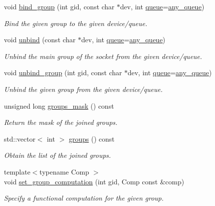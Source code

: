 \begin{DoxyCompactItemize}
void \hyperlink{classnet_1_1pfq_a2b8310320db5d583625d67eaae8be047}{bind\-\_\-group} (int gid, const char $\ast$dev, int \hyperlink{classnet_1_1queue}{queue}=\hyperlink{classnet_1_1pfq_a0d4eca6d0925b7c49365675c9cf9385c}{any\-\_\-queue})
\begin{DoxyCompactList}\small\item\em Bind the given group to the given device/queue. \end{DoxyCompactList}\item 
void \hyperlink{classnet_1_1pfq_a769e03c88c5cda30f14e67a7a398aac3}{unbind} (const char $\ast$dev, int \hyperlink{classnet_1_1queue}{queue}=\hyperlink{classnet_1_1pfq_a0d4eca6d0925b7c49365675c9cf9385c}{any\-\_\-queue})
\begin{DoxyCompactList}\small\item\em Unbind the main group of the socket from the given device/queue. \end{DoxyCompactList}\item 
void \hyperlink{classnet_1_1pfq_a3bbc9de1354d5cd3e99804e55618a1a3}{unbind\-\_\-group} (int gid, const char $\ast$dev, int \hyperlink{classnet_1_1queue}{queue}=\hyperlink{classnet_1_1pfq_a0d4eca6d0925b7c49365675c9cf9385c}{any\-\_\-queue})
\begin{DoxyCompactList}\small\item\em Unbind the given group from the given device/queue. \end{DoxyCompactList}\item 
unsigned long \hyperlink{classnet_1_1pfq_a37b9270cf29bb67a4b4e577646b39a78}{groups\-\_\-mask} () const 
\begin{DoxyCompactList}\small\item\em Return the mask of the joined groups. \end{DoxyCompactList}\item 
std\-::vector$<$ int $>$ \hyperlink{classnet_1_1pfq_af63de1f94a492284cfed78695f2e93ec}{groups} () const 
\begin{DoxyCompactList}\small\item\em Obtain the list of the joined groups. \end{DoxyCompactList}\item 
{\footnotesize template$<$typename Comp $>$ }\\void \hyperlink{classnet_1_1pfq_af434441b7c824c81e3888f771b70e023}{set\-\_\-group\-\_\-computation} (int gid, Comp const \&comp)
\begin{DoxyCompactList}\small\item\em Specify a functional computation for the given group. \end{DoxyCompactList}\item 

\end{DoxyCompactItemize}

